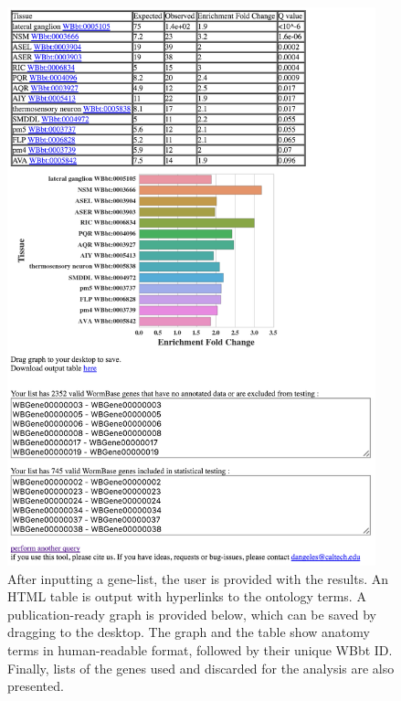 \documentclass{bmcart}
\begin{document}
\begin{backmatter}
\begin{figure}
	\centering
    \includegraphics[width=0.95\textwidth]{figures/guiresults.png}
  	\captionsetup{width= 0.95\textwidth}
 	\caption{
  After inputting a gene-list, the user is provided with the results. 
  An HTML table is output with hyperlinks to the ontology terms. A 
  publication-ready graph is provided below, which can be saved by 
  dragging to the desktop. The graph and the table show anatomy terms in
  human-readable format, followed by their unique WBbt ID. Finally, lists 
  of the genes used and discarded for the analysis are also presented.
  }
  \label{fig:GUIresults}
\end{figure}




\end{backmatter}
\end{document}
